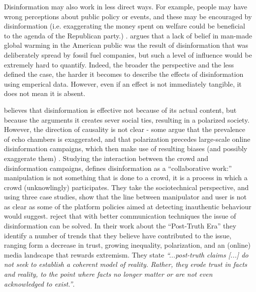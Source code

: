 \documentclass[10pt,a4paper]{article}
\begin{document}
Disinformation may also work in less direct ways. For example, people may have wrong perceptions about public policy or events, and these may be encouraged by disinformation (i.e. exaggerating the money spent on welfare could be beneficial to the agenda of the Republican party.) \citep{Tucker2018}. \cite{Kolmes2011} argues that a lack of belief in man-made global warming in the American public was the result of disinformation that was deliberately spread by fossil fuel companies, but such a level of influence would be extremely hard to quantify. Indeed, the broader the perspective and the less defined the case, the harder it becomes to describe the effects of disinformation using emperical data. However, even if an effect is not immediately tangible, it does not mean it is absent.

\cite{Asmolov2018} believes that disinformation is effective not because of its actual content, but because the arguments it creates sever social ties, resulting in a polarized society. However, the direction of causality is not clear - some argue that the prevalence of echo chambers is exaggerated, and that polarization precedes large-scale online disinformation campaigns, which then make use of resulting biases (and possibly exaggerate them) \citep{Tucker2018}. Studying the interaction between the crowd and disinformation campaigns, \cite{Starbird2019} defines disinformation as a ``collaborative work:'' manipulation is not something that is done to a crowd, it is a process in which a crowd (unknowlingly) participates. They take the sociotechnical perspective, and using three case studies, show that the line between manipulator and user is not as clear as some of the platform policies aimed at detecting inauthentic behaviour would suggest. 
\cite{lewandowsky2017beyond} reject that with better communication techniques the issue of disinformation can be solved. In their work about the ``Post-Truth Era'' they identify a number of trends that they believe have contributed to the issue, ranging form a decrease in trust, growing inequality, polarization, and an (online) media landscape that rewards extremism. They state \textit{``...post-truth claims [...] do not seek to establish a coherent model of reality. Rather, they erode trust in facts and reality, to the point where facts no longer matter or are not even acknowledged to exist.''}.  \\
\end{document}
